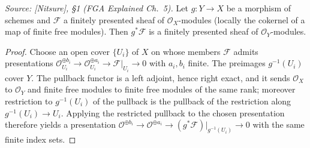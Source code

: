 \begin{lemma}
  \label{lem:pullback_finite_presentation}
  \textit{Source: [Nitsure], \S 1 (FGA Explained Ch.~5).}
  Let \(g : Y \to X\) be a morphism of schemes and \(\mathcal{F}\) a finitely
  presented sheaf of \(\mathcal{O}_X\)-modules (locally the cokernel of a map
  of finite free modules).  Then \(g^* \mathcal{F}\) is a finitely presented
  sheaf of \(\mathcal{O}_Y\)-modules.
\end{lemma}
\begin{proof}\leanok
  Choose an open cover \(\{U_i\}\) of \(X\) on whose members \(\mathcal{F}\)
  admits presentations
  \(\mathcal{O}_{U_i}^{\oplus b_i} \to \mathcal{O}_{U_i}^{\oplus a_i} \to
  \mathcal{F}|_{U_i} \to 0\) with \(a_i, b_i\) finite.  The preimages
  \(g^{-1}(U_i)\) cover \(Y\).  The pullback functor is a left adjoint, hence
  right exact, and it sends \(\mathcal{O}_X\) to \(\mathcal{O}_Y\) and finite
  free modules to finite free modules of the same rank; moreover restriction
  to \(g^{-1}(U_i)\) of the pullback is the pullback of the restriction along
  \(g^{-1}(U_i) \to U_i\).  Applying the restricted pullback to the chosen
  presentation therefore yields a presentation
  \(\mathcal{O}^{\oplus b_i} \to \mathcal{O}^{\oplus a_i} \to
  (g^*\mathcal{F})|_{g^{-1}(U_i)} \to 0\) with the same finite index sets.
\end{proof}

